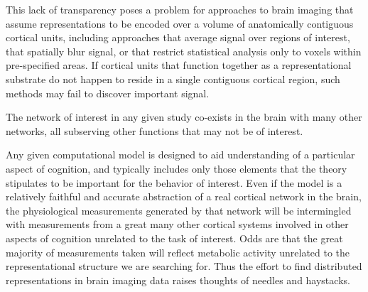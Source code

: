 \begin{APAenumerate}
This lack of transparency poses a problem for approaches to brain imaging that assume representations to be encoded over a volume of anatomically contiguous cortical units, including approaches that average signal over regions of interest, that spatially blur signal, or that restrict statistical analysis only to voxels within pre-specified areas. If cortical units that function together as a representational substrate do not happen to reside in a single contiguous cortical region, such methods may fail to discover important signal.

\item The network of interest in any given study co-exists in the brain with many other networks, all subserving other functions that may not be of interest.

Any given computational model is designed to aid understanding of a particular aspect of cognition, and typically includes only those elements that the theory stipulates to be important for the behavior of interest. Even if the model is a relatively faithful and accurate abstraction of a real cortical network in the brain, the physiological measurements generated by that network will be intermingled with measurements from a great many other cortical systems involved in other aspects of cognition unrelated to the task of interest. Odds are that the great majority of measurements taken will reflect metabolic activity unrelated to the representational structure we are searching for. Thus the effort to find distributed representations in brain imaging data raises thoughts of needles and haystacks. 

\end{APAenumerate}


